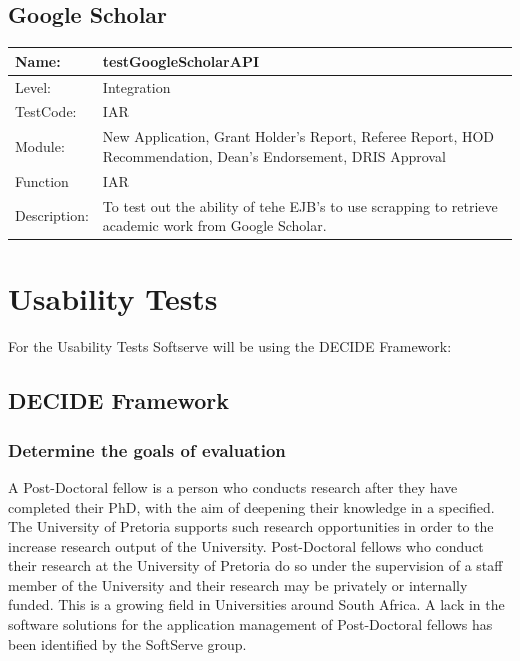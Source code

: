 \documentclass[12pt]{article}
\begin{document}
\begin{flushleft}
\subsection{Google Scholar}
\begin{center}
\begin{tabular}{|l|p{12cm}|}
\hline
 Name: & testGoogleScholarAPI \\
\hline
Level: & Integration \\
\hline
TestCode: & IAR \\
\hline
Module:&  New Application, Grant Holder's Report, Referee Report, HOD Recommendation, Dean's Endorsement, DRIS Approval\\
\hline
Function & IAR \\
\hline
Description: & To test out the ability of tehe EJB's to use scrapping to retrieve academic work from Google Scholar. \\
\hline
\end{tabular}
\end{center}

\newpage
\section{Usability Tests}
For the Usability Tests Softserve will be using the DECIDE Framework:
\subsection{DECIDE Framework}
\subsubsection{Determine the goals of evaluation}

A Post-Doctoral fellow is a person who conducts research after they have completed their PhD, with the aim of deepening their knowledge in a specified. The University of Pretoria supports such research opportunities in order to the increase research output of the University. Post-Doctoral fellows who conduct their research at the University of Pretoria do so under the supervision of a staff member of the University and their research may be privately or internally funded. This is a growing field in Universities around South Africa. A lack in the software solutions for the application management of Post-Doctoral fellows has been identified by the SoftServe group.


\end{flushleft}
\end{document}
